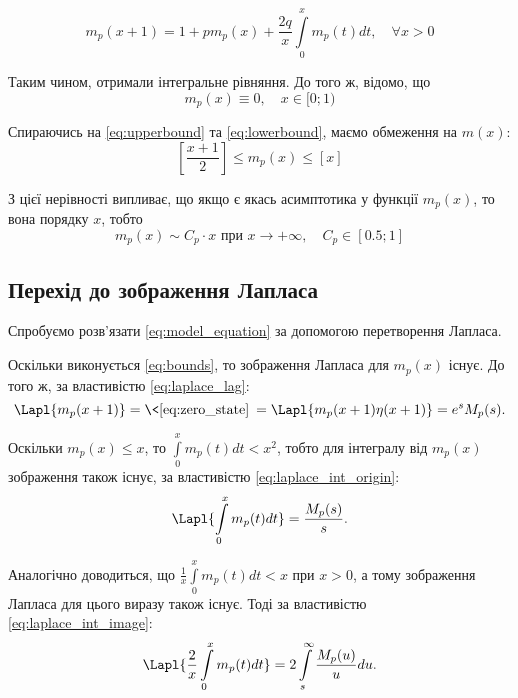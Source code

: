 \begin{equation}
\label{eq:model_equation}
m_{p} (x + 1) = 1 + p m_{p} (x) + \frac{2q}{x} \int\limits_0^{x} m_{p} (t) dt,\quad \forall x > 0
\end{equation}

Таким чином, отримали інтегральне рівняння. До того ж, відомо, що
\begin{equation}
\label{eq:zero_state}
m_{p}(x) \equiv 0, \quad x \in [0; 1)
\end{equation}

Спираючись на \eqref{eq:upperbound} та \eqref{eq:lowerbound}, маємо обмеження на $m(x)$:
\begin{equation}
\label{eq:bounds}
\left[\frac{x+1}{2}\right] \leq m_{p}(x) \leq \left[x\right]
\end{equation}

З цієї нерівності випливає, що якщо є якась асимптотика у функції $m_{p}(x)$, то вона порядку $x$, тобто
\begin{equation}
\label{eq:bounds_inference}
m_{p}(x) \sim C_{p}\cdot x \text{ при } x \rightarrow +\infty, \quad C_{p} \in [0.5; 1]
\end{equation}

\subsection{Перехід до зображення Лапласа}
\label{sec:model_integral_laplace}

Спробуємо розв'язати \eqref{eq:model_equation} за допомогою перетворення Лапласа.

Оскільки виконується \eqref{eq:bounds}, то зображення Лапласа для $m_{p}(x)$ існує. До того ж, за властивістю \eqref{eq:laplace_lag}:
\begin{equation}
\label{eq:model_shifted_laplace}
\Lapl{m_{p}(x+1)}=\<\eqref{eq:zero_state}\>=\Lapl{m_{p}(x+1)\eta(x+1)}=e^s M_{p} (s).
\end{equation}

Оскільки $m_{p}(x) \leq x$, то $\int\limits_0^x m_{p}(t) dt < x^2$, тобто для інтегралу від $m_{p}(x)$ зображення також існує, за властивістю \eqref{eq:laplace_int_origin}:
$$\Lapl{\int\limits_0^x m_p(t) dt} = \frac{M_p(s)}{s}.$$

Аналогічно доводиться, що $\frac{1}{x}\int\limits_0^x m_{p}(t) dt < x$ при $x>0$, а тому зображення Лапласа для цього виразу також існує. Тоді за властивістю \eqref{eq:laplace_int_image}:
$$\Lapl{\frac{2}{x}\int\limits_0^x m_{p}(t) dt} = 2 \int\limits_s^\infty \frac{M_{p}(u)}{u} du.$$

